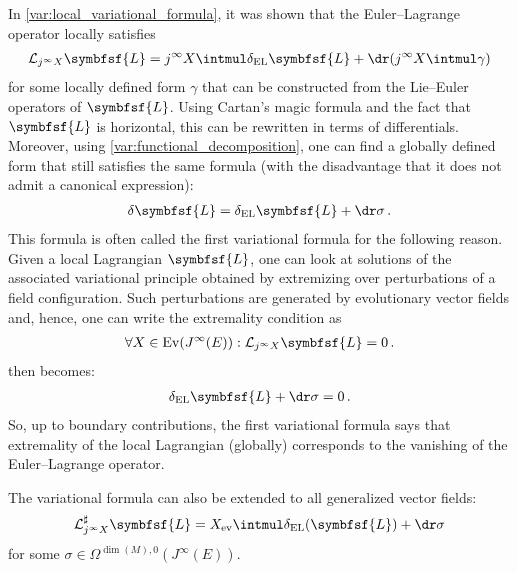     \begin{property}
        In \cref{var:local_variational_formula}, it was shown that the Euler--Lagrange operator locally satisfies
        \begin{gather}
            \mathcal{L}_{j^\infty X}\symbfsf{L} = j^\infty X\intmul\delta_{\text{EL}}\symbfsf{L} + \dr(j^\infty X\intmul\gamma)
        \end{gather}
        for some locally defined form $\gamma$ that can be constructed from the Lie--Euler operators of $\symbfsf{L}$. Using Cartan's magic formula and the fact that $\symbfsf{L}$ is horizontal, this can be rewritten in terms of differentials. Moreover, using \cref{var:functional_decomposition}, one can find a globally defined form that still satisfies the same formula (with the disadvantage that it does not admit a canonical expression):
        \begin{gather}
            \label{var:first_variational_formula}
            \delta\symbfsf{L} = \delta_{\text{EL}}\symbfsf{L} + \dr\sigma\,.
        \end{gather}
        This formula is often called the first variational formula for the following reason. Given a local Lagrangian $\symbfsf{L}$, one can look at solutions of the associated variational principle obtained by extremizing over perturbations of a field configuration. Such perturbations are generated by evolutionary vector fields and, hence, one can write the extremality condition as
        \begin{gather}
            \forall X\in\mathrm{Ev}(J^\infty(E)):\mathcal{L}_{j^\infty X}\symbfsf{L} = 0\,.
        \end{gather}
         then becomes:
        \begin{gather}
            \delta_\mathrm{EL}\symbfsf{L} + \dr\sigma = 0\,.
        \end{gather}
        So, up to boundary contributions, the first variational formula says that extremality of the local Lagrangian (globally) corresponds to the vanishing of the Euler--Lagrange operator.
    \end{property}
    \begin{result}\label{var:general_variational_formula}
        The variational formula can also be extended to all generalized vector fields:
        \begin{gather}
            \mathcal{L}^\sharp_{j^\infty X}\symbfsf{L} = X_{\text{ev}}\intmul\delta_{\text{EL}}(\symbfsf{L}) + \dr\sigma
        \end{gather}
        for some $\sigma\in\Omega^{\dim(M),0}(J^\infty(E))$.
    \end{result}

